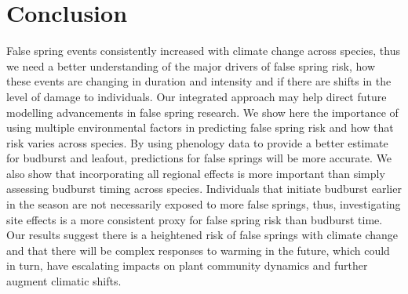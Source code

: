 \documentclass{article}\usepackage[]{graphicx}\usepackage[]{color}
\begin{document}
\section*{Conclusion}
False spring events consistently increased with climate change across species, thus we need a better understanding of the major drivers of false spring risk, how these events are changing in duration and intensity and if there are shifts in the level of damage to individuals. Our integrated approach may help direct future modelling advancements in false spring research. We show here the importance of using multiple environmental factors in predicting false spring risk and how that risk varies across species. By using phenology data to provide a better estimate for budburst and leafout, predictions for false springs will be more accurate. We also show that incorporating all regional effects is more important than simply assessing budburst timing across species. Individuals that initiate budburst earlier in the season are not necessarily exposed to more false springs, thus, investigating site effects is a more consistent proxy for false spring risk than budburst time. Our results suggest there is a heightened risk of false springs with climate change and that there will be complex responses to warming in the future, which could in turn, have escalating impacts on plant community dynamics and further augment climatic shifts.  

  
\end{document}
